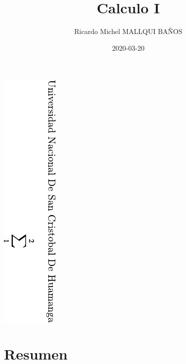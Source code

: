 \documentclass[12pt,]{krantz}
\title{Calculo I}
\author{Ricardo Michel MALLQUI BAÑOS}
\institute{Universidad Nacional San Cristóbal De Huamanga}
\date{2020-03-20}
\theoremstyle{definition}
\theoremstyle{definition}
\theoremstyle{definition}
\theoremstyle{remark}
\begin{document}
\maketitle

\thispagestyle{empty}
\begin{center}
\includegraphics{dedication.pdf}
\end{center}


{
\setcounter{tocdepth}{1}
\tableofcontents
}
\newcommand{\N}{\mathbb{N}}
\newcommand{\R}{\mathbb{R}}
\newcommand{\CC}{\mathbb{C}}
\newcommand{\I}{\mathbb{I}}
\newcommand{\f}{\mathbb{f}}
\newcommand{\X}{\mathbb{X}}
\newcommand{\D}{\mathbb{D}}
\newcommand{\Z}{\mathbb{Z}}
\newcommand{\Q}{\mathbb{Q}}
\newcommand{\norm}[1]{\left\Vert#1\right\Vert}
\newcommand{\abs}[1]{\left\vert#1\right\vert}
\newcommand{\set}[1]{\left\{#1\right\}}
\newcommand{\seq}[1]{\left<#1\right>}
\newcommand{\co}[1]{\left[#1\right]}
\newcommand{\cc}[1]{\left(#1\right)}
\newcommand{\J}{\mathcal{J}}
\newcommand{\K}{\mathcal{K}}
\newcommand{\M}{\mathcal{M}}
\newcommand{\F}{\mathcal{F}}

\hypertarget{resumen}{%
\chapter*{Resumen}\label{resumen}}
\end{document}
